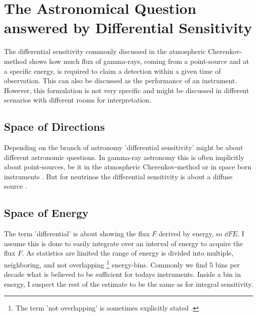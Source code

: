 \documentclass{article}%
\begin{document}
\section{The Astronomical Question answered by Differential Sensitivity}
\label{SecAstronomicalQuastion}
The differential sensitivity commonly discussed in the atmospheric Cherenkov-method shows how much flux of gamma-rays, coming from a point-source and at a specific energy, is required to claim a detection within a given time of observation.
%
This can also be discussed as the performance of an instrument.\\
%
However, this formulation is not very specific and might be discussed in different scenarios with different rooms for interpretation.
%
\subsection*{Space of Directions}
%
Depending on the branch of astronomy 'differential sensitivity' might be about different astronomic questions.
%
In gamma-ray astronomy this is often implicitly about point-sources, be it in the atmospheric Cherenkov-method \cite{cta2018baseline,cortina2016machete} or in space born instruments \cite{wood2016fermiperformance}.
%
But for neutrinos the differential sensitivity is about a diffuse source \cite{marinelli2021km3netarca}.
%
\subsection*{Space of Energy}
%
The term 'differential' is about showing the flux $F$ derived by energy, so $\dd{F}{E}$.
%
I assume this is done to easily integrate over an interval of energy to acquire the flux $F$.
%
As statistics are limited the range of energy is divided into multiple, neighboring, and not overlapping \footnote{The term 'not overlapping' is sometimes explicitly stated \cite{cta2018baseline}.} energy-bins.
%
Commonly we find 5 bins per decade what is believed to be sufficient for todays instruments.
%
Inside a bin in energy, I suspect the rest of the estimate to be the same as for integral sensitivity.
%
\end{document}
